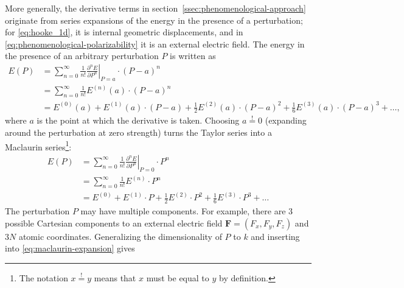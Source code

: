 \documentclass[%
class = book,%
crop = false,%
float = true,%
multi = true,%
preview = false,%
]{standalone}
\begin{document}
More generally, the derivative terms in section~\ref{ssec:phenomenological-approach} originate from series expansions of the energy in the presence of a perturbation; for \eqref{eq:hooke_1d}, it is internal geometric displacements, and in \eqref{eq:phenomenological-polarizability} it is an external electric field. The energy in the presence of an arbitrary perturbation \(P\) is written as
\begin{equation}
  \label{eq:taylor-expansion}
  \begin{aligned}
    E(P) &= \sum_{n = 0}^{\infty} \frac{1}{n!} \left. \frac{\partial^{n} E}{\partial P^{n}} \right|_{P = a} \cdot (P - a)^{n} \\
    &= \sum_{n = 0}^{\infty} \frac{1}{n!} E^{(n)}(a) \cdot (P - a)^{n} \\
    &= E^{(0)}(a) + E^{(1)}(a) \cdot (P - a) + \frac{1}{2} E^{(2)}(a) \cdot (P - a)^{2} + \frac{1}{6} E^{(3)}(a) \cdot (P - a)^{3} + \dots ,
  \end{aligned}
\end{equation}
where \(a\) is the point at which the derivative is taken. Choosing \(a \overset{!}{=} 0\) (expanding around the perturbation at zero strength) turns the Taylor series into a Maclaurin series\footnote{\label{foot:overset}The notation \(x \overset{!}{=} y\) means that \(x\) must be equal to \(y\) by definition.}:
\begin{equation}
  \label{eq:maclaurin-expansion}
  \begin{aligned}
    E(P) &= \sum_{n = 0}^{\infty} \frac{1}{n!} \left. \frac{\partial^{n} E}{\partial P^{n}} \right|_{P = 0} \cdot P^{n} \\
    &= \sum_{n = 0}^{\infty} \frac{1}{n!} E^{(n)} \cdot P^{n} \\
    &= E^{(0)} + E^{(1)} \cdot P + \frac{1}{2} E^{(2)} \cdot P^{2} + \frac{1}{6} E^{(3)} \cdot P^{3} + \dots
  \end{aligned}
\end{equation}
The perturbation \(P\) may have multiple components. For example, there are 3 possible Cartesian components to an external electric field \(\mathbf{F} = (F_{x}, F_{y}, F_{z})\) and \(3N\) atomic coordinates. Generalizing the dimensionality of \(P\) to \(k\) and inserting into \eqref{eq:maclaurin-expansion} gives
\end{document}
